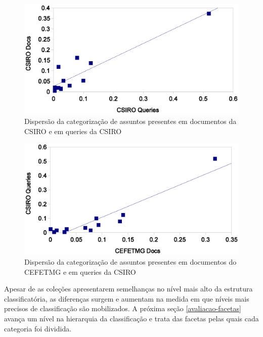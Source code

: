 \begin{figure}
	\caption{\label{fig:disp-docqueryCSIRO}Dispersão da categorização de assuntos presentes em documentos da CSIRO e em queries da CSIRO}

	\centering
		\includegraphics[width=1.0\textwidth]{fig/disp-docqueryCSIRO.eps}

\end{figure}







\begin{figure}
	\caption{\label{fig:disp-docquery}Dispersão da categorização de assuntos presentes em documentos do CEFETMG e em queries da CSIRO}

	\centering
		\includegraphics[width=1.0\textwidth]{fig/disp-docquery.eps}

\end{figure}


Apesar de as coleções apresentarem semelhanças no nível mais alto da estrutura classificatória, as diferenças surgem e aumentam na medida em que níveis mais precisos de classificação são mobilizados. A próxima seção \ref{avaliacao-facetas} avança um nível na hierarquia da classificação e trata das facetas pelas quais cada categoria foi dividida.



